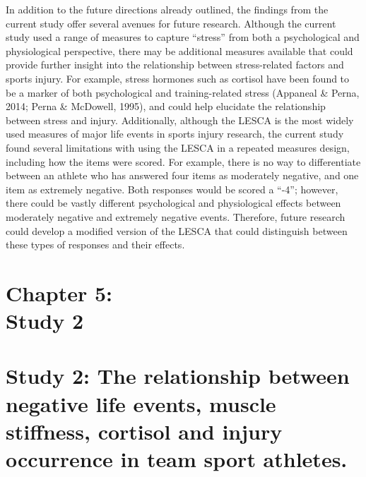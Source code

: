 \documentclass[man,floatsintext]{apa6}
\begin{document}
In addition to the future directions already outlined, the findings from the current study offer several avenues for future research.
Although the current study used a range of measures to capture \enquote{stress} from both a psychological and physiological perspective, there may be additional measures available that could provide further insight into the relationship between stress-related factors and sports injury.
For example, stress hormones such as cortisol have been found to be a marker of both psychological and training-related stress (Appaneal \& Perna, 2014; Perna \& McDowell, 1995), and could help elucidate the relationship between stress and injury.
Additionally, although the LESCA is the most widely used measures of major life events in sports injury research, the current study found several limitations with using the LESCA in a repeated measures design, including how the items were scored.
For example, there is no way to differentiate between an athlete who has answered four items as moderately negative, and one item as extremely negative.
Both responses would be scored a \enquote{-4}; however, there could be vastly different psychological and physiological effects between moderately negative and extremely negative events. Therefore, future research could develop a modified version of the LESCA that could distinguish between these types of responses and their effects.
\clearpage

\vspace*{3cm}

\section[Chapter 5: Study 2]{\Large{Chapter 5: \\ Study 2}}

\clearpage

\section{Study 2: The relationship between negative life events, muscle stiffness, cortisol and injury occurrence in team sport athletes.}
\end{document}

